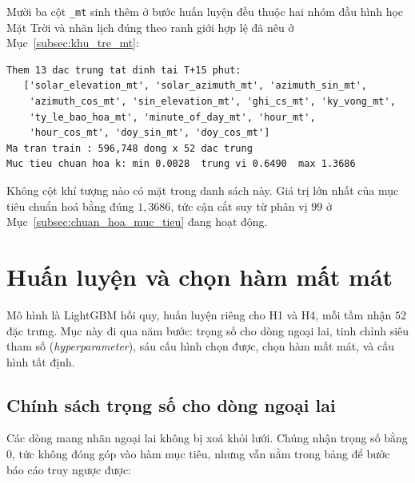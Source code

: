 \documentclass[12pt, a4paper]{report}
\begin{document}
\enlargethispage{3\baselineskip}
Mười ba cột \texttt{\_mt} sinh thêm ở bước huấn luyện đều thuộc hai nhóm đầu hình học Mặt Trời
và nhãn lịch đúng theo ranh giới hợp lệ đã nêu ở Mục~\ref{subsec:khu_tre_mt}:

\begingroup
\par{}\vspace{8pt}
\small\renewcommand{\baselinestretch}{1.0}\selectfont
\begin{verbatim}
Them 13 dac trung tat dinh tai T+15 phut:
   ['solar_elevation_mt', 'solar_azimuth_mt', 'azimuth_sin_mt',
    'azimuth_cos_mt', 'sin_elevation_mt', 'ghi_cs_mt', 'ky_vong_mt',
    'ty_le_bao_hoa_mt', 'minute_of_day_mt', 'hour_mt',
    'hour_cos_mt', 'doy_sin_mt', 'doy_cos_mt']
Ma tran train : 596,748 dong x 52 dac trung
Muc tieu chuan hoa k: min 0.0028  trung vi 0.6490  max 1.3686
\end{verbatim}
\par\vspace{8pt}
\endgroup
Không cột khí tượng nào có mặt trong danh sách này. Giá trị lớn nhất của mục tiêu chuẩn hoá
bằng đúng $1{,}3686$, tức cận cắt suy từ phân vị $99$ ở Mục~\ref{subsec:chuan_hoa_muc_tieu} đang hoạt động.
\newpage
\FloatBarrier
\section{Huấn luyện và chọn hàm mất mát}

Mô hình là LightGBM hồi quy, huấn luyện riêng cho H1 và H4, mỗi tầm nhận $52$ đặc trưng.
Mục này đi qua năm bước: trọng số cho dòng ngoại lai, tinh chỉnh siêu tham số
(\textit{hyperparameter}), sáu cấu hình chọn được, chọn hàm mất mát, và cấu hình tất định.

\FloatBarrier
\subsection{Chính sách trọng số cho dòng ngoại lai}

Các dòng mang nhãn ngoại lai không bị xoá khỏi lưới. Chúng nhận trọng số bằng $0$, tức không
đóng góp vào hàm mục tiêu, nhưng vẫn nằm trong bảng để bước báo cáo truy ngược được:
\end{document}
